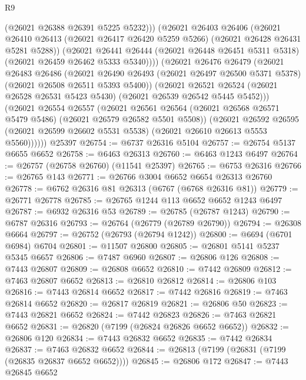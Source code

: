 \begin{lexlean}{R9}
\begin{coremodule}
{{{{{{{{{{{{{{{{{{{{{{{{{{{{{{{{{{{{{{{{{{{{{{{{{{{{{{{{{{{{{{{{{{{{{{{{{{{{{{{{{{{{              (@26021 @26388 @26391 @5225 @5232)))
          (@26021
            @26403
            @26406
            (@26021
              @26410
              @26413
              (@26021 @26417 @26420 @5259 @5266)
              (@26021 @26428 @26431 @5281 @5288))
            (@26021
              @26441
              @26444
              (@26021 @26448 @26451 @5311 @5318)
              (@26021 @26459 @26462 @5333 @5340))))
        (@26021
          @26476
          @26479
          (@26021
            @26483
            @26486
            (@26021
              @26490
              @26493
              (@26021 @26497 @26500 @5371 @5378)
              (@26021 @26508 @26511 @5393 @5400))
            (@26021
              @26521
              @26524
              (@26021 @26528 @26531 @5423 @5430)
              (@26021 @26539 @26542 @5445 @5452)))
          (@26021
            @26554
            @26557
            (@26021
              @26561
              @26564
              (@26021 @26568 @26571 @5479 @5486)
              (@26021 @26579 @26582 @5501 @5508))
            (@26021
              @26592
              @26595
              (@26021 @26599 @26602 @5531 @5538)
              (@26021 @26610 @26613 @5553 @5560))))))
    @25397
@26754 := @6737 @26316 @5104
@26757 := @26754 @5137 @6655 @6652
@26758 := @6463 @26313
@26760 := @6463 @1243 @6497
@26764 := @26757 (@26758 @26760) (@11541 @25397)
@26765 := @6753 @26316
@26766 := @26765 @143
@26771 := @26766 @3004 @6652 @6654 @26313 @26760
@26778 := @6762 @26316 @81 @26313 (@6767 (@6768 @26316 @81))
@26779 := @26771 @26778
@26785 := @26765 @1244 @113 @6652 @6652 @1243 @6497
@26787 := @6932 @26316 @53
@26789 := @26785 (@26787 @1243)
@26790 := @6787 @26316
@26793 := @26764 (@26779 (@26789 @26790))
@26794 := @26308 @6664
@26797 := @26752 (@26793 (@26794 @1242))
@26800 := @6694 (@6701 @6984) @6704
@26801 := @11507 @26800
@26805 := @26801 @5141 @5237 @5345 @6657
@26806 := @7487 @6960
@26807 := @26806 @126
@26808 := @7443 @26807
@26809 := @26808 @6652
@26810 := @7442 @26809
@26812 := @7463 @26807 @6652
@26813 := @26810 @26812
@26814 := @26806 @103
@26816 := @7443 @26814 @6652
@26817 := @7442 @26816
@26819 := @7463 @26814 @6652
@26820 := @26817 @26819
@26821 := @26806 @50
@26823 := @7443 @26821 @6652
@26824 := @7442 @26823
@26826 := @7463 @26821 @6652
@26831 := @26820 (@7199 (@26824 @26826 @6652 @6652))
@26832 := @26806 @120
@26834 := @7443 @26832 @6652
@26835 := @7442 @26834
@26837 := @7463 @26832 @6652
@26844 := @26813 (@7199 (@26831 (@7199 (@26835 @26837 @6652 @6652))))
@26845 := @26806 @172
@26847 := @7443 @26845 @6652
}}}}}}}}}}}}}}}}}}}}}}}}}}}}}}}}}}}}}}}}}}}}}}}}}}}}}}}}}}}}}}}}}}}}}}}}}}}}}}}}}}}}
\end{coremodule}
\end{lexlean}
